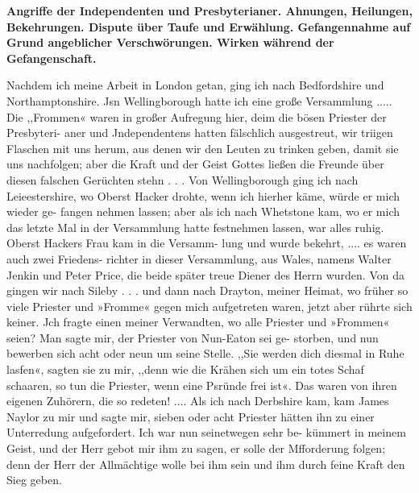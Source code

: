 \begin{center}
\textbf{Angriffe der Independenten und Presbyterianer. Ahnungen,
Heilungen, Bekehrungen. Dispute über Taufe und Erwählung.
Gefangennahme auf Grund angeblicher Verschwörungen. Wirken
während der Gefangenschaft.}
\end{center}


Nachdem ich meine Arbeit in London getan, ging ich nach
Bedfordshire und Northamptonshire. Jsn Wellingborough hatte
ich eine große Versammlung ..... Die ,,Frommen« waren in
großer Aufregung hier, deim die bösen Priester der Presbyteri-
aner und Jndependentens hatten fälschlich ausgestreut, wir triigen
Flaschen mit uns herum, aus denen wir den Leuten zu trinken
geben, damit sie uns nachfolgen; aber die Kraft und der Geist
Gottes ließen die Freunde über diesen falschen Gerüchten stehn . . .
Von Wellingborough ging ich nach Leieestershire, wo Oberst
Hacker drohte, wenn ich hierher käme, würde er mich wieder ge-
fangen nehmen lassen; aber als ich nach Whetstone kam, wo er
mich das letzte Mal in der Versammlung hatte festnehmen lassen,
war alles ruhig. Oberst Hackers Frau kam in die Versamm-
lung und wurde bekehrt, .... es waren auch zwei Friedens-
richter in dieser Versammlung, aus Wales, namens Walter
Jenkin und Peter Price, die beide später treue Diener des
Herrn wurden.
Von da gingen wir nach Sileby . . . und dann nach Drayton,
meiner Heimat, wo früher so viele Priester und »Fromme« gegen
mich aufgetreten waren, jetzt aber rührte sich keiner. Jch fragte
einen meiner Verwandten, wo alle Priester und »Frommen«
seien? Man sagte mir, der Priester von Nun-Eaton sei ge-
storben, und nun bewerben sich acht oder neun um seine Stelle.
,,Sie werden dich diesmal in Ruhe lasfen«, sagten sie zu mir,
,,denn wie die Krähen sich um ein totes Schaf schaaren, so tun die
Priester, wenn eine Psründe frei ist«. Das waren von ihren
eigenen Zuhörern, die so redeten! ....
Als ich nach Derbshire kam, kam James Naylor zu mir
und sagte mir, sieben oder acht Priester hätten ihn zu einer
Unterredung aufgefordert. Ich war nun seinetwegen sehr be-
kümmert in meinem Geist, und der Herr gebot mir ihm zu sagen,
er solle der Mfforderung folgen; denn der Herr der Allmächtige
wolle bei ihm sein und ihm durch feine Kraft den Sieg geben.


